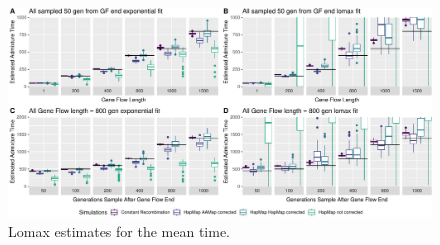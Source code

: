 \documentclass[]{article}
\begin{document}
\begin{figure}
\centering
\includegraphics{Admixture_Time_Inference_Paper_Draft_files/figure-latex/figS2-1.pdf}
\caption{\label{fig:figS2} Lomax estimates for the mean time.}
\end{figure}


\end{document}
